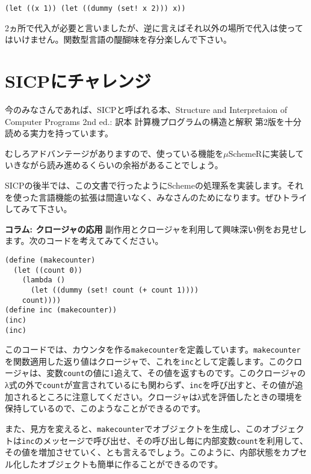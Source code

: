 \begin{lstlisting}
(let ((x 1)) (let ((dummy (set! x 2))) x))
\end{lstlisting}

2ヵ所で代入が必要と言いましたが、逆に言えばそれ以外の場所で代入は使って
はいけません。関数型言語の醍醐味を存分楽しんで下さい。

\section{SICPにチャレンジ}
今のみなさんであれば、SICPと呼ばれる本、Structure and Interpretaion of Computer Programs 2nd ed.: 訳本 計算機プログラムの構造と解釈 第2版\cite{SICP}を十分読める実力を持っています。

むしろアドバンテージがありますので、使っている機能を$\mu$SchemeRに実装していきながら読み進めるくらいの余裕があることでしょう。

SICPの後半では、この文書で行ったようにSchemeの処理系を実装します。それを使った言語機能の拡張は間違いなく、みなさんのためになります。ぜひトライしてみて下さい。


\begin{breakitembox}[l]{\bf コラム: クロージャの応用} 
副作用とクロージャを利用して興味深い例をお見せします。次のコードを考えてみてください。

\begin{lstlisting}
(define (makecounter)
  (let ((count 0))
    (lambda ()
      (let ((dummy (set! count (+ count 1))))
	count))))
(define inc (makecounter))
(inc)
(inc)
\end{lstlisting}

このコードでは、カウンタを作る{\tt makecounter}を定義しています。{\tt makecounter}を関数適用した返り値はクロージャで、これを{\tt inc}として定義します。このクロージャは、変数{\tt count}の値に1追えて、その値を返すものです。このクロージャのλ式の外で{\tt count}が宣言されているにも関わらず、{\tt inc}を呼び出すと、その値が追加されるところに注意してください。クロージャはλ式を評価したときの環境を保持しているので、このようなことができるのです。

また、見方を変えると、{\tt makecounter}でオブジェクトを生成し、このオブジェクトは{\tt inc}のメッセージで呼び出せ、その呼び出し毎に内部変数{\tt count}を利用して、その値を増加させていく、とも言えるでしょう。このように、内部状態をカプセル化したオブジェクトも簡単に作ることができるのです。
\end{breakitembox}

